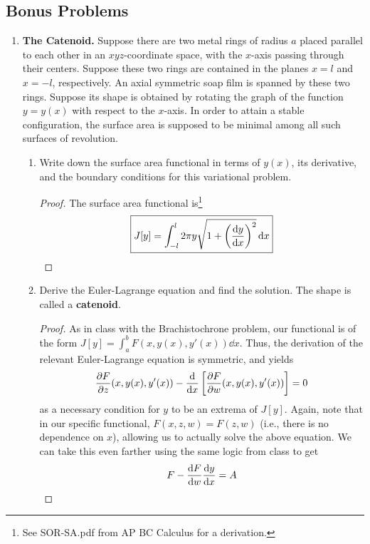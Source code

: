 \documentclass[../psets.tex]{subfiles}
\begin{document}
\subsection*{Bonus Problems}
\begin{enumerate}
    \item \textbf{The Catenoid.} Suppose there are two metal rings of radius $a$ placed parallel to each other in an $xyz$-coordinate space, with the $x$-axis passing through their centers. Suppose these two rings are contained in the planes $x=l$ and $x=-l$, respectively. An axial symmetric soap film is spanned by these two rings. Suppose its shape is obtained by rotating the graph of the function $y=y(x)$ with respect to the $x$-axis. In order to attain a stable configuration, the surface area is supposed to be minimal among all such surfaces of revolution.
    \begin{enumerate}
        \item Write down the surface area functional in terms of $y(x)$, its derivative, and the boundary conditions for this variational problem.
        \begin{proof}
            The surface area functional is\footnote{See SOR-SA.pdf from AP BC Calculus for a derivation.}
            \begin{equation*}
                \boxed{J[y] = \int_{-l}^l2\pi y\sqrt{1+\left( \dv{y}{x} \right)^2}\dd{x}}
            \end{equation*}
        \end{proof}
        \item Derive the Euler-Lagrange equation and find the solution. The shape is called a \textbf{catenoid}.
        \begin{proof}
            As in class with the Brachistochrone problem, our functional is of the form $J[y]=\int_a^bF(x,y(x),y'(x))\dd{x}$. Thus, the derivation of the relevant Euler-Lagrange equation is symmetric, and yields
            \begin{equation*}
                {\pdv{F}{z}}(x,y(x),y'(x))-\dv{x}\left[ {\pdv{F}{w}}(x,y(x),y'(x)) \right] = 0
            \end{equation*}
            as a necessary condition for $y$ to be an extrema of $J[y]$. Again, note that in our specific functional, $F(x,z,w)=F(z,w)$ (i.e., there is no dependence on $x$), allowing us to actually solve the above equation. We can take this even farther using the same logic from class to get
            \begin{equation*}
                F-\dv{F}{w}\dv{y}{x} = A

\end{equation*}
\end{proof}
\end{enumerate}
\end{enumerate}
\end{document}
